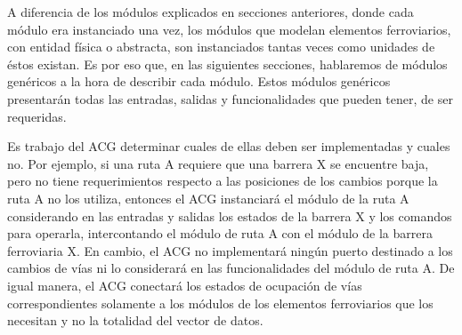 A diferencia de los módulos explicados en secciones anteriores, donde cada módulo era instanciado una vez, los módulos que modelan elementos ferroviarios, con entidad física o abstracta, son instanciados tantas veces como unidades de éstos existan. Es por eso que, en las siguientes secciones, hablaremos de módulos genéricos a la hora de describir cada módulo. Estos módulos genéricos presentarán todas las entradas, salidas y funcionalidades que pueden tener, de ser requeridas. 

Es trabajo del ACG determinar cuales de ellas deben ser implementadas y cuales no. Por ejemplo, si una ruta A requiere que una barrera X se encuentre baja, pero no tiene requerimientos respecto a las posiciones de los cambios porque la ruta A no los utiliza, entonces el ACG instanciará el módulo de la ruta A considerando en las entradas y salidas los estados de la barrera X y los comandos para operarla, intercontando el módulo de ruta A con el módulo de la barrera ferroviaria X. En cambio, el ACG no implementará ningún puerto destinado a los cambios de vías ni lo considerará en las funcionalidades del módulo de ruta A. De igual manera, el ACG conectará los estados de ocupación de vías correspondientes solamente a los módulos de los elementos ferroviarios que los necesitan y no la totalidad del vector de datos.







